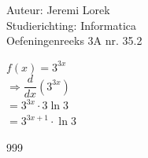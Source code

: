 \documentclass[a4paper]{article}
\begin{document}
  
\noindent \large Auteur: Jeremi Lorek\\
\noindent \large Studierichting: Informatica\\
\noindent \large Oefeningenreeks 3A nr. 35.2\\

\medskip
\normalsize

$f(x) =  3^{3x} $\\ 

$\Rightarrow \dfrac{d}{dx} \left( 3^{3x} \right)$  \\

$= 3^{3x} \cdot 3 \ln 3$  \\

$= 3^{3x+1} \cdot \ln 3$  \\

\begin{thebibliography}{999}
\end{thebibliography}
\end{document}
